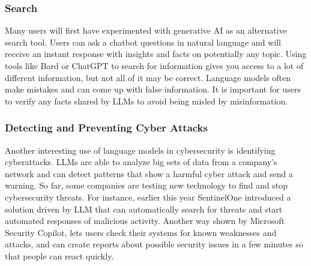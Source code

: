 \subsubsection{Search}
Many users will first have experimented with generative AI as an alternative search tool. Users can ask a chatbot questions in natural language and will receive an instant response with insights and facts on potentially any topic.
\vskip 0.5cm
Using tools like Bard or ChatGPT to search for information gives you access to a lot of different information, but not all of it may be correct. 
\vskip 0.5cm
Language models often make mistakes and can come up with false information. It is important for users to verify any facts shared by LLMs to avoid being misled by misinformation.
\subsubsection{Detecting and Preventing Cyber Attacks}
Another interesting use of language models in cybersecurity is identifying cyberattacks. LLMs are able to analyze big sets of data from a company's network and can detect patterns that show a harmful cyber attack and send a warning.
\vskip 0.5cm
So far, some companies are testing new technology to find and stop cybersecurity threats. For instance, earlier this year SentinelOne introduced a solution driven by LLM that can automatically search for threats and start automated responses of malicious activity.
\vskip 0.5cm
Another way shown by Microsoft Security Copilot, lets users check their systems for known weaknesses and attacks, and can create reports about possible security issues in a few minutes so that people can react quickly.
